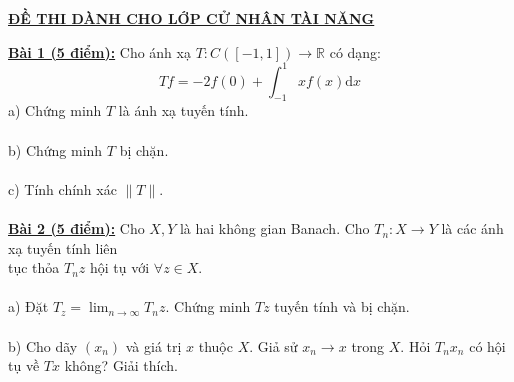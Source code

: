 \documentclass[10pt, a4paper]{article}
\begin{document}
\begin{center}
	\color{blue}\underline{\textbf{ĐỀ THI DÀNH CHO LỚP CỬ NHÂN TÀI NĂNG}}
\end{center}
\color{red}\underline{\textbf{Bài 1 (5 điểm):}} \color{black}Cho ánh xạ $T:C([-1,1])\rightarrow\mathbb R$ có dạng: $$Tf=-2f(0)+\displaystyle\int_{-1}^1xf(x)\text{d}x$$
\color{red}a) \color{black}Chứng minh $T$ là ánh xạ tuyến tính.\\\\
\color{red}b) \color{black}Chứng minh $T$ bị chặn.\\\\
\color{red}c) \color{black}Tính chính xác $\lVert T\rVert$.\\\\
\color{red}\underline{\textbf{Bài 2 (5 điểm):}} \color{black}Cho $X,Y$ là hai không gian Banach. Cho $T_n:X\rightarrow Y$ là các ánh xạ tuyến tính liên\\ tục thỏa $T_nz$ hội tụ với $\forall z\in X$.\\\\
\color{red}a) \color{black}Đặt $T_z=\displaystyle\lim_{n\rightarrow\infty}T_nz$. Chứng minh $Tz$ tuyến tính và bị chặn.\\\\
\color{red}b) \color{black}Cho dãy $(x_n)$ và giá trị $x$ thuộc $X$. Giả sử $x_n\rightarrow x$ trong $X$. Hỏi $T_nx_n$ có hội tụ về $Tx$ không? Giải thích.
 
\newpage
\end{document}
